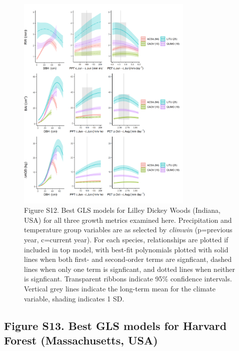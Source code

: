 \documentclass[
]{article}
\begin{document}
\begin{figure}
\centering
\includegraphics[width=0.75\textwidth,height=\textheight]{tables_figures/SI_figures/composite_plots/LillyDickey.png}
\caption{Figure S12. Best GLS models for Lilley Dickey Woods (Indiana,
USA) for all three growth metrics examined here. Precipitation and
temperature group variables are as selected by \emph{climwin}
(p=previous year, c=current year). For each species, relationships are
plotted if included in top model, with best-fit polynomials plotted with
solid lines when both first- and second-order terms are signficant,
dashed lines when only one term is signficant, and dotted lines when
neither is signficant. Transparent ribbons indicate 95\% confidence
intervals. Vertical grey lines indicate the long-term mean for the
climate variable, shading indicates 1 SD.}
\end{figure}

\newpage

\hypertarget{figure-s13.-best-gls-models-for-harvard-forest-massachusetts-usa}{%
\subsection{Figure S13. Best GLS models for Harvard Forest
(Massachusetts,
USA)}\label{figure-s13.-best-gls-models-for-harvard-forest-massachusetts-usa}}
\end{document}
